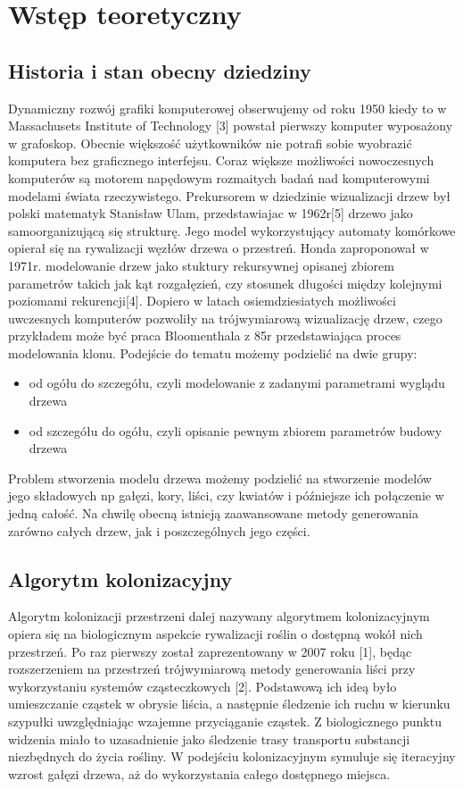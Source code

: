 \chapter{Wstęp teoretyczny}



\section{Historia i stan obecny dziedziny}
Dynamiczny rozwój grafiki komputerowej obserwujemy od roku 1950 kiedy to w Massachusets Institute of Technology [3] powstał pierwszy
komputer wyposażony w grafoskop. Obecnie większość użytkowników nie potrafi sobie wyobrazić komputera bez graficznego interfejsu.
Coraz większe możliwości nowoczesnych komputerów są motorem napędowym rozmaitych badań nad komputerowymi modelami świata rzeczywistego.
Prekursorem w dziedzinie wizualizacji drzew był polski matematyk Stanisław Ulam, przedstawiajac w 1962r[5] drzewo jako samoorganizującą się
strukturę. Jego model wykorzystujący automaty komórkowe opierał się na rywalizacji węzłów  drzewa o przestreń.
Honda zaproponował w 1971r. modelowanie drzew jako stuktury rekursywnej opisanej
zbiorem parametrów takich jak kąt rozgałęzień, czy stosunek długości między kolejnymi poziomami rekurencji[4]. Dopiero w latach osiemdziesiatych
możliwości uwczesnych komputerów pozwoliły na trójwymiarową wizualizację drzew, czego przykładem może być praca Bloomenthala z 85r \cite{bloomenthal}
przedstawiająca proces modelowania klonu. Podejście do tematu możemy podzielić na dwie grupy:
\begin{itemize}
\item od ogółu do szczegółu, czyli modelowanie z zadanymi parametrami wyglądu drzewa
\item od szczegółu do ogółu, czyli opisanie pewnym zbiorem parametrów budowy drzewa
\end{itemize}
Problem stworzenia modelu drzewa możemy podzielić na stworzenie modelów jego składowych np gałęzi, kory, liści, czy kwiatów i późniejsze
ich połączenie w jedną całość. Na chwilę obecną istnieją zaawansowane metody generowania zarówno całych drzew, jak i poszczególnych jego części.

\section{Algorytm kolonizacyjny}
Algorytm kolonizacji przestrzeni dalej nazywany algorytmem kolonizacyjnym opiera się na biologicznym aspekcie rywalizacji roślin o dostępną wokół nich przestrzeń. Po raz pierwszy został zaprezentowany w 2007 roku [1], będąc rozszerzeniem na przestrzeń trójwymiarową metody generowania liści przy wykorzystaniu systemów cząsteczkowych [2]. Podstawową ich ideą było umieszczanie cząstek w obrysie liścia, a następnie śledzenie ich ruchu w kierunku szypułki uwzględniając wzajemne przyciąganie cząstek. Z biologicznego punktu widzenia miało to uzasadnienie jako śledzenie trasy transportu substancji niezbędnych do życia rośliny. W podejściu kolonizacyjnym symuluje się iteracyjny wzrost gałęzi drzewa, aż do wykorzystania całego dostępnego miejsca.


